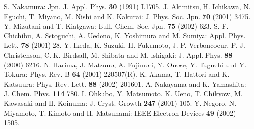 \documentclass{jpsj2}
\begin{document}
\begin{thebibliography}{99} %
 S. Nakamura: Jpn. J. Appl. Phys. \textbf{30} (1991) L1705.
 J. Akimitsu, H. Ichikawa, N. Eguchi, T. Miyano, M. Nishi and K. Kakurai: J. Phys. Soc. Jpn. \textbf{70} (2001) 3475.
 Y. Mizutani and T. Kiatgawa: Bull. Chem. Soc. Jpn. \textbf{75}  (2002) 623.
 S. F. Chichibu, A. Setoguchi, A. Uedono, K. Yoshimura and M. Sumiya: Appl. Phys. Lett. \textbf{78} (2001) 28.
  Y. Ikeda, K. Suzuki, H. Fukumoto, J. P. Verboncoeur, P. J. Christenson, C. K. Birdsall, M. Shibata and M. Ishigaki: J. Appl. Phys. \textbf{88} (2000) 6216.
 N. Harima, J. Matsuno, A. Fujimori, Y. Onose, Y. Taguchi and Y. Tokura: Phys. Rev. B \textbf{64} (2001) 220507(R).
 K. Akama, T. Hattori and K. Katsuura: Phys. Rev. Lett. \textbf{88} (2002) 201601.
 A. Nakayama and K. Yamashita: J. Chem. Phys. \textbf{114} 780.
 I. Ohkubo, Y. Matsumoto, K. Ueno, T. Chikyow, M. Kawasaki and H. Koinuma: J. Cryst. Growth \textbf{247} (2001) 105.
 Y. Negoro, N. Miyamoto, T. Kimoto and H. Matsunami: IEEE Electron Devices \textbf{49} (2002) 1505.
\end{thebibliography}
\end{document}
